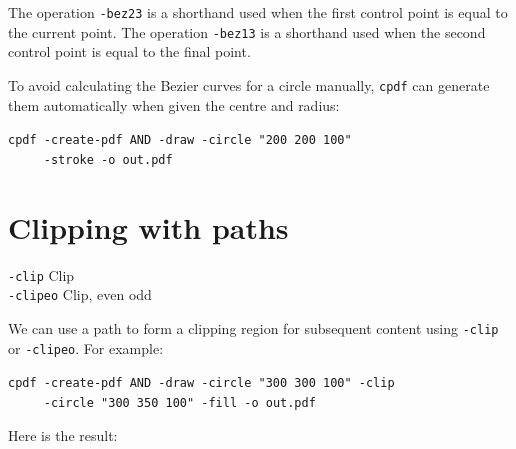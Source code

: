 \documentclass{book}
\begin{document}
\noindent The operation \texttt{-bez23} is a shorthand used when the first control point is equal to the current point. The operation \texttt{-bez13} is a shorthand used when the second control point is equal to the final point.

To avoid calculating the Bezier curves for a circle manually, \texttt{cpdf} can generate them automatically when given the centre and radius:

\begin{framed}
 \noindent\small\verb?cpdf -create-pdf AND -draw -circle "200 200 100"?\\
 \noindent\small\verb?     -stroke -o out.pdf?
\end{framed}

\section{Clipping with paths}
  {\small\begin{framed}
   \noindent\verb!-clip! Clip\\
   \noindent\verb!-clipeo! Clip, even odd
  \end{framed}}

\noindent We can use a path to form a clipping region for subsequent content using \texttt{-clip} or \texttt{-clipeo}. For example: 

\begin{framed}
 \noindent\small\verb?cpdf -create-pdf AND -draw -circle "300 300 100" -clip?\\
 \noindent\small\verb?     -circle "300 350 100" -fill -o out.pdf?
\end{framed}

\noindent Here is the result:

\bigskip
{}
\bigskip
\end{document}

